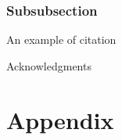 \subsubsection{Subsubsection}
An example of citation\cite{latex,texbook}
\begin{acknowledgment}
Acknowledgments
\end{acknowledgment}




\appendix
\section{Appendix}

\begin{biography}
\end{biography}


